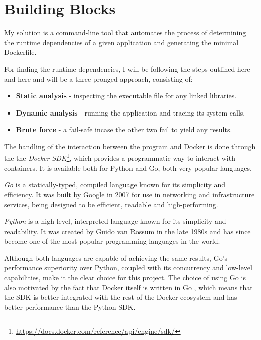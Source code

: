 \chapter{Building Blocks}
\label{chapter:building-blocks}


My solution is a command-line tool that automates the process of determining the runtime dependencies of a 
given application and generating the minimal Dockerfile.

For finding the runtime dependencies, I will be following the steps outlined here \cite{unikraft-app-catalog} and here \cite{identify-dependencies} and will
be a three-pronged approach, consisting of:
\begin{itemize}
    \item \textbf{Static analysis} - inspecting the executable file for any linked libraries.
    \item \textbf{Dynamic analysis} - running the application and tracing its system calls.
    \item \textbf{Brute force} - a fail-safe incase the other two fail to yield any results.
\end{itemize}


The handling of the interaction between the program and Docker is done through the the \textit{Docker SDK}\footnote{\url{https://docs.docker.com/reference/api/engine/sdk/}},
which provides a programmatic way to interact with containers. It is available both
for Python and Go, both very popular languages.

\textit{Go} is a statically-typed, compiled language known for its simplicity and efficiency. It was built by Google 
in 2007 for use in networking and infrastructure services, being designed to be efficient, readable and high-performing. \cite{golang}

\textit{Python} is a high-level, interpreted language known for its simplicity and readability. It was created by Guido van Rossum in the late 1980s and has since become one of the most popular programming languages in the world. \cite{python}

Although both languages are capable of achieving the same results, Go's performance superiority over Python, coupled with 
its concurrency and low-level capabilities, make it the clear choice for this project.
The choice of using Go is also motivated by the fact that Docker itself is written in Go \cite{docker-go}, which means that the SDK is
better integrated with the rest of the Docker ecosystem and has better performance than the Python SDK.
